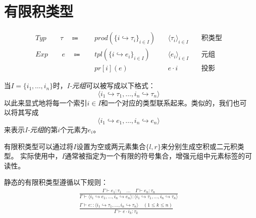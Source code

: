 \section{有限积类型}
\begin{equation*}
\begin{aligned}
Typ \qquad \tau \quad \Coloneqq \quad &prod(\{i \hookrightarrow \tau_i \}_{i\in I})
\quad &\langle \tau_i \rangle_{i\in I} \quad &\mbox{积类型} \\
Exp \qquad e \quad \Coloneqq \quad &tpl(\{i \hookrightarrow e_i \}_{i\in I})
\quad &\langle e_i \rangle_{i\in I} \quad &\mbox{元组} \\
&pr[i](e) \quad &e \cdot i \quad &\mbox{投影}
\end{aligned}
\end{equation*}


当$I=\{i_1,\dots,i_n\}$时，\textit{I-元组}可以被写成以下格式：
$$\langle i_1 \hookrightarrow \tau_1, \dots, i_n \hookrightarrow \tau_n \rangle$$
以此来显式地将每一个索引$i\in I$和一个对应的类型联系起来。类似的，我们也可以将其写成
$$\langle i_1 \hookrightarrow e_1, \dots, i_n \hookrightarrow e_n \rangle$$
来表示\textit{I-元组}的第$i$个元素为$e_i$。

有限积类型可以通过将$I$设置为空或两元素集合$\{l,r\}$来分别生成空积或二元积类型。
实际使用中，$I$通常被指定为一个有限的符号集合，增强元组中元素标签的可读性。

静态的有限积类型遵循以下规则：
\begin{subequations}
    \begin{gather}
    \frac{\Gamma \vdash e_1 : \tau_1 \quad \dots \quad \Gamma \vdash e_n : \tau_n}
    {\Gamma \vdash \langle i_1 \hookrightarrow e_1,\dots,i_n\hookrightarrow e_n \rangle
    : \langle i_1 \hookrightarrow \tau_1,\dots,i_n \hookrightarrow \tau_n \rangle} \\
    \frac{\Gamma \vdash e : : \langle i_1 \hookrightarrow \tau_1,\dots,i_n \hookrightarrow \tau_n \rangle
    \quad (1\leq k \leq n)}
    {\Gamma \vdash e \cdot i_k : \tau_k}
    \end{gather}
\end{subequations}

